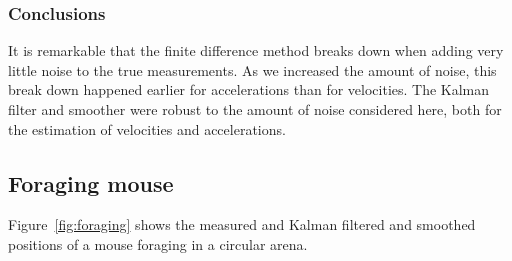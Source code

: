 \documentclass[12pt]{article}
\begin{document}
\subsubsection{Conclusions}

It is remarkable that the finite difference method breaks down when adding very
little noise to the true measurements. As we increased the amount of noise,
this break down happened earlier for accelerations than for velocities.
%
The Kalman filter and smoother were robust to the amount of noise considered
here, both for the estimation of velocities and accelerations.

\subsection{Foraging mouse}

Figure~\ref{fig:foraging} shows the measured and Kalman filtered and smoothed
positions of a mouse foraging in a circular arena.
\end{document}

